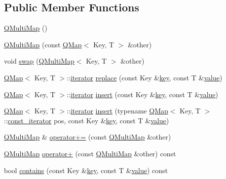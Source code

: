 \subsection*{Public Member Functions}
\begin{DoxyCompactItemize}
\item 
\hyperlink{class_q_multi_map_aeb16603087ff81f07f9438de93528b66}{Q\+Multi\+Map} ()
\item 
\hyperlink{class_q_multi_map_a2e2af5d76f189e2bcbfe5c67b02df5e7}{Q\+Multi\+Map} (const \hyperlink{class_q_map}{Q\+Map}$<$ Key, T $>$ \&other)
\item 
void \hyperlink{class_q_multi_map_a1caa02d81e4487d753ec7cf63c509523}{swap} (\hyperlink{class_q_multi_map}{Q\+Multi\+Map}$<$ Key, T $>$ \&other)
\item 
\hyperlink{class_q_map}{Q\+Map}$<$ Key, T $>$\+::\hyperlink{class_q_map_1_1iterator}{iterator} \hyperlink{class_q_multi_map_a71c0ddeadd47b9410ef2d64c9fa24d72}{replace} (const Key \&\hyperlink{class_q_map_a7ad0c404885c5287fe593849e4bc80d6}{key}, const T \&\hyperlink{class_q_map_ab9c04f61f4abd94439d4431118a238e5}{value})
\item 
\hyperlink{class_q_map}{Q\+Map}$<$ Key, T $>$\+::\hyperlink{class_q_map_1_1iterator}{iterator} \hyperlink{class_q_multi_map_ae067c2f922dd6e13001d93ace23a964a}{insert} (const Key \&\hyperlink{class_q_map_a7ad0c404885c5287fe593849e4bc80d6}{key}, const T \&\hyperlink{class_q_map_ab9c04f61f4abd94439d4431118a238e5}{value})
\item 
\hyperlink{class_q_map}{Q\+Map}$<$ Key, T $>$\+::\hyperlink{class_q_map_1_1iterator}{iterator} \hyperlink{class_q_multi_map_a471e6ea8e6b77ab1a3fbcfd64c53bcf0}{insert} (typename \hyperlink{class_q_map}{Q\+Map}$<$ Key, T $>$\+::\hyperlink{class_q_map_1_1const__iterator}{const\+\_\+iterator} pos, const Key \&\hyperlink{class_q_map_a7ad0c404885c5287fe593849e4bc80d6}{key}, const T \&\hyperlink{class_q_map_ab9c04f61f4abd94439d4431118a238e5}{value})
\item 
\hyperlink{class_q_multi_map}{Q\+Multi\+Map} \& \hyperlink{class_q_multi_map_aa9c75ef8f14c919a318b494b54422958}{operator+=} (const \hyperlink{class_q_multi_map}{Q\+Multi\+Map} \&other)
\item 
\hyperlink{class_q_multi_map}{Q\+Multi\+Map} \hyperlink{class_q_multi_map_aef448db293ef347dca82cc017c559888}{operator+} (const \hyperlink{class_q_multi_map}{Q\+Multi\+Map} \&other) const 
\item 
bool \hyperlink{class_q_multi_map_ab240b90606e155eef7c80c2ea9cabe74}{contains} (const Key \&\hyperlink{class_q_map_a7ad0c404885c5287fe593849e4bc80d6}{key}, const T \&\hyperlink{class_q_map_ab9c04f61f4abd94439d4431118a238e5}{value}) const 

\end{DoxyCompactItemize}
